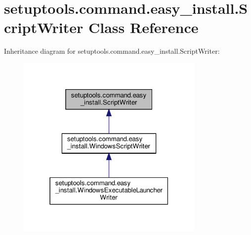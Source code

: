 \hypertarget{classsetuptools_1_1command_1_1easy__install_1_1ScriptWriter}{}\section{setuptools.\+command.\+easy\+\_\+install.\+Script\+Writer Class Reference}
\label{classsetuptools_1_1command_1_1easy__install_1_1ScriptWriter}


Inheritance diagram for setuptools.\+command.\+easy\+\_\+install.\+Script\+Writer\+:
\nopagebreak
\begin{figure}[H]
\begin{center}
\leavevmode
\includegraphics[width=259pt]{classsetuptools_1_1command_1_1easy__install_1_1ScriptWriter__inherit__graph}
\end{center}
\end{figure}
